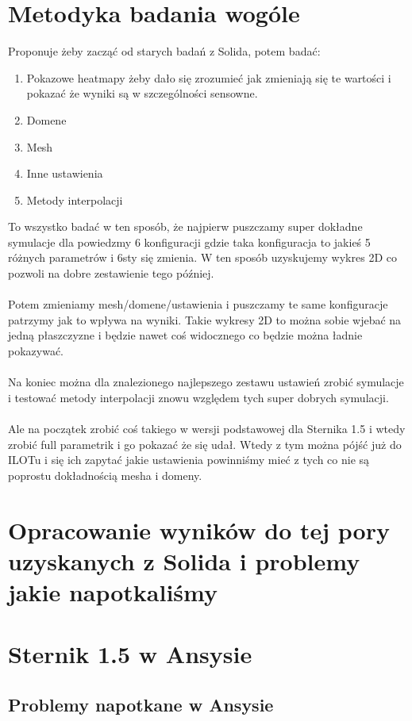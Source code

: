 \documentclass{article}
\begin{document}
\section{Metodyka badania wogóle}
Proponuje żeby zacząć od starych badań z Solida, potem badać:
\begin{enumerate}
    \item Pokazowe heatmapy żeby dało się zrozumieć jak zmieniają się te wartości i pokazać że wyniki
    są w szczególności sensowne.
    \item Domene
    \item Mesh
    \item Inne ustawienia
    \item Metody interpolacji
\end{enumerate}
To wszystko badać w ten sposób, że najpierw puszczamy super dokładne symulacje dla 
powiedzmy 6 konfiguracji gdzie taka konfiguracja to jakieś 5 różnych parametrów i 6sty
się zmienia. W ten sposób uzyskujemy wykres 2D co pozwoli na dobre zestawienie tego później.\\\\
Potem zmieniamy mesh/domene/ustawienia i puszczamy te same konfiguracje patrzymy jak to wpływa na wyniki. 
Takie wykresy 2D to można sobie wjebać na jedną płaszczyzne i będzie nawet coś widocznego co 
będzie można ładnie pokazywać.\\\\
Na koniec można dla znalezionego najlepszego zestawu ustawień zrobić symulacje i testować
metody interpolacji znowu względem tych super dobrych symulacji.\\\\
Ale na początek zrobić coś takiego w wersji podstawowej dla Sternika 1.5 i wtedy zrobić full parametrik
i go pokazać że się udał. Wtedy z tym można pójść już do ILOTu i się ich zapytać jakie ustawienia
powinniśmy mieć z tych co nie są poprostu dokładnością mesha i domeny.

\section{Opracowanie wyników do tej pory uzyskanych z Solida i problemy jakie napotkaliśmy}

\section{Sternik 1.5 w Ansysie}
\subsection{Problemy napotkane w Ansysie}
\end{document}
